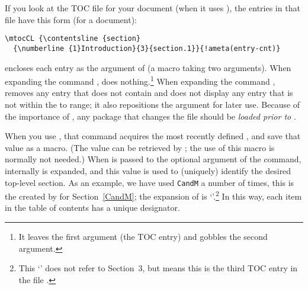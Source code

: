 \documentclass[10pt]{article}
\def\MP#1{\marginpar{\raggedleft\small\itshape #1}}
\begin{document}
If you look at the TOC file for your document (when it uses ),
the entries in that file have this form (for a  document):
\begin{Verbatim}[fontsize=\small,commandchars=!()]
\mtocCL {\contentsline {section}
  {\numberline {1}Introduction}{3}{section.1}}{!ameta(entry-cnt)}
\end{Verbatim}
 encloses each entry as the argument of  (a
macro taking two arguments). When expanding the command
,  does nothing.\footnote{It leaves the
first argument (the TOC entry) and gobbles the second argument.} When
expanding the command ,  removes any entry
that does not contain  and does not display any entry that
is not within the  to  range; it also
repositions the  argument for later use.
Because\MP{Warning!} of the importance of
, any package that changes the  file should be
\emph{loaded prior to} .

When you use , that command acquires
the most recently defined , and save that value as a
macro. (The value can be retrieved by
; the use of this macro is normally
not needed.) When  is passed to the optional argument of
the  command, internally
 is expanded, and this value is used
to (uniquely) identify the desired top-level section. As an example, we
have used \texttt{CandM} a number of times, this is the 
created by  for Section~\ref*{CandM}; the expansion of
 is `\texttt{}'.\footnote{This `\texttt{}'
does not refer to Section~3, but means this is the third TOC entry in the file .}  In this way, each
item in the table of contents has a unique designator.

\end{document}
